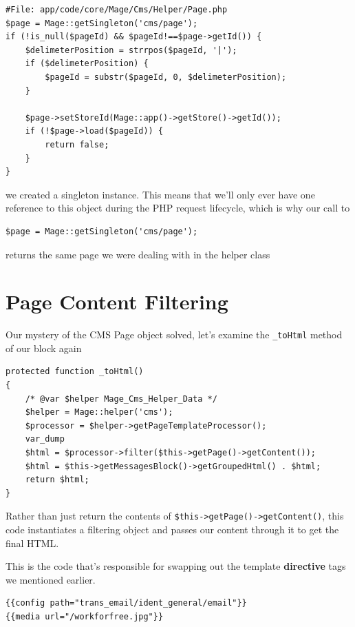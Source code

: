 \documentclass[oneside]{book}
\begin{document}
\begin{lstlisting}
#File: app/code/core/Mage/Cms/Helper/Page.php
$page = Mage::getSingleton('cms/page');        
if (!is_null($pageId) && $pageId!==$page->getId()) {
    $delimeterPosition = strrpos($pageId, '|');
    if ($delimeterPosition) {
        $pageId = substr($pageId, 0, $delimeterPosition);
    }

    $page->setStoreId(Mage::app()->getStore()->getId());
    if (!$page->load($pageId)) {
        return false;
    }
}

\end{lstlisting}


we created a singleton instance.  This means that we'll only ever have one reference to this object during the PHP request lifecycle, which is why our call to 

\begin{lstlisting}
$page = Mage::getSingleton('cms/page');

\end{lstlisting}


returns the same page we were dealing with in the helper class  

\section{Page Content Filtering}

Our mystery of the CMS Page object solved, let's examine the \footnotesize\texttt{\_toHtml} \normalsize  method of our block again

\begin{lstlisting}
protected function _toHtml()
{
    /* @var $helper Mage_Cms_Helper_Data */
    $helper = Mage::helper('cms');
    $processor = $helper->getPageTemplateProcessor();
    var_dump
    $html = $processor->filter($this->getPage()->getContent());
    $html = $this->getMessagesBlock()->getGroupedHtml() . $html;
    return $html;
}

\end{lstlisting}


Rather than just return the contents of \footnotesize\texttt{\$this-\textgreater getPage()-\textgreater getContent()}\normalsize, this code instantiates a filtering object and passes our content through it to get the final HTML.

This is the code that's responsible for swapping out the template \textbf{directive} tags we mentioned earlier.

\begin{lstlisting}
{{config path="trans_email/ident_general/email"}}
{{media url="/workforfree.jpg"}}

\end{lstlisting}
\end{document}
